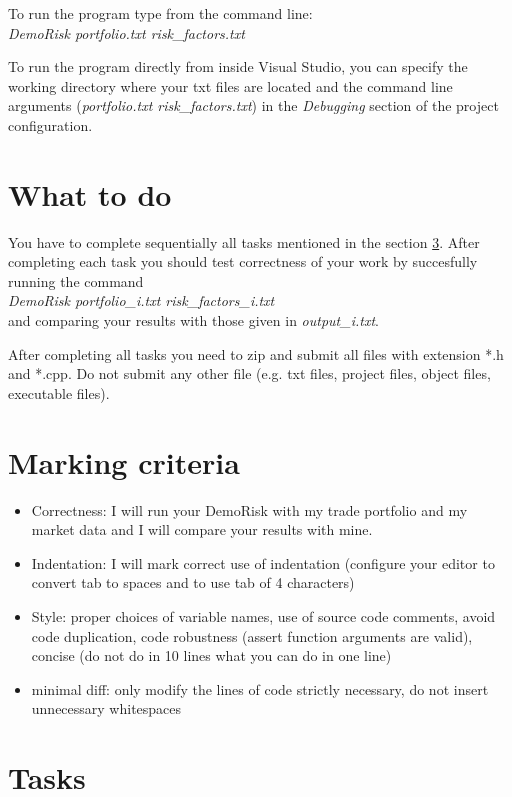 \documentclass[10pt]{article}
\begin{document}
To run the program type from the command line:\\
\textit{DemoRisk portfolio.txt risk\_factors.txt}

To run the program directly from inside Visual Studio, you can specify the working directory where your txt files are located and the command line arguments (\textit{portfolio.txt risk\_factors.txt}) in the \textit{Debugging} section of the project configuration.

\section{What to do}
You have to complete sequentially all tasks mentioned in the section \ref{sec:task}. After completing each task you should test correctness of your work by succesfully running the command \\
\textit{DemoRisk portfolio\_i.txt risk\_factors\_i.txt}\\
and comparing your results with those given in \textit{output\_i.txt}.

After completing all tasks you need to zip and submit all files with extension *.h and *.cpp. Do not submit any other file (e.g. txt files, project files, object files, executable files).

\section{Marking criteria}
\begin{itemize}
\item Correctness: I will run your DemoRisk with my trade portfolio and my market data and I will compare your results with mine.
\item Indentation: I will mark correct use of indentation (configure your editor to convert tab to spaces and to use tab of 4 characters)
\item Style: proper choices of variable names, use of source code comments, avoid code duplication, code robustness (assert function arguments are valid), concise (do not do in 10 lines what you can do in one line)
\item minimal diff: only modify the lines of code strictly necessary, do not insert unnecessary whitespaces
\end{itemize}

\section{Tasks}
\label{sec:task}
\end{document}
